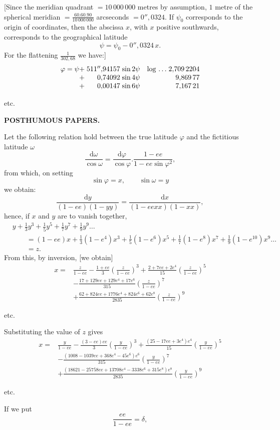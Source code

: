 [Since the meridian quadrant \(=10\,000\,000\) metres by assumption, \(1\) metre of the spherical meridian \(=\frac{60.60.90}{10\,000\,000}\) arcseconds \(=0''{,}0324\). If \(\psi_0\) corresponds to the origin of coordinates, then the abscissa \(x\), with \(x\) positive southwards, corresponds to the geographical latitude
\[\psi=\psi_0-0''{,}0324\,x.\]
For the flattening \(\frac1{302{,}68}\) we have:]
\[
\begin{array}{@{}r@{\;}r@{\;}l@{\quad}l@{\;}r@{}}
\varphi=\psi+&511''{,}94157&\sin2\psi&\log\,.\,.\,.&2{,}709\,2204\\
+&0{,}74092&\sin4\psi&&9{,}869\,77\\
+&0{,}00147&\sin6\psi&&7{,}167\,21
\end{array}
\]
{\centering etc.\par}

\par\clearpage
{}\hfill{\small\textbf{POSTHUMOUS PAPERS.}}\hfill\null\par\medskip
{\centering [23.]\par}
Let the following relation hold between the true latitude \(\varphi\) and the fictitious latitude \(\omega\)
\[
\frac{\mathrm d\omega}{\cos\omega}=\frac{\mathrm d\varphi}{\cos\varphi}.\frac{1-ee}{1-ee\sin\varphi^2},
\]
\noindent from which, on setting
\[\sin\varphi=x,\qquad\sin\omega=y\]
\noindent we obtain:
\[
\frac{\mathrm dy}{(1-ee)(1-yy)}=\frac{\mathrm dx}{(1-eexx)(1-xx)},
\]
\noindent hence, if \(x\) and \(y\) are to vanish together,
\[
\begin{aligned}
&y+\tfrac13y^3+\tfrac15y^5+\tfrac17y^7+\tfrac19y^9\ldots\\
&\qquad=(1-ee)x+\tfrac13(1-e^4)x^3+\tfrac15(1-e^6)x^5+\tfrac17(1-e^8)x^7+\tfrac19(1-e^{10})x^9\ldots\\
&\qquad=z.
\end{aligned}
\]
From this, by inversion, [we obtain]
\[
\begin{aligned}
x={}&\frac{z}{1-ee}-\frac{1+ee}{3}\left(\frac{z}{1-ee}\right)^3+\frac{2+7ee+2e^4}{15}\left(\frac{z}{1-ee}\right)^5\\
&-\frac{17+129ee+129e^4+17e^6}{315}\left(\frac{z}{1-ee}\right)^7\\
&+\frac{62+824ee+1776e^4+824e^6+62e^8}{2835}\left(\frac{z}{1-ee}\right)^9
\end{aligned}
\]
{\centering etc.\par}
Substituting the value of \(z\) gives
\[
\begin{aligned}
x={}&\frac{y}{1-ee}-\frac{(3-ee)ee}{3}\left(\frac{y}{1-ee}\right)^3+\frac{(25-17ee+3e^4)e^4}{15}\left(\frac{y}{1-ee}\right)^5\\
&-\frac{(1008-1039ee+368e^4-45e^6)e^6}{315}\left(\frac{y}{1-ee}\right)^7\\
&+\frac{(18621-25758ee+13708e^4-3338e^6+315e^8)e^8}{2835}\left(\frac{y}{1-ee}\right)^9
\end{aligned}
\]
{\centering etc.\par}
If we put
\[\frac{ee}{1-ee}=\delta,\]

